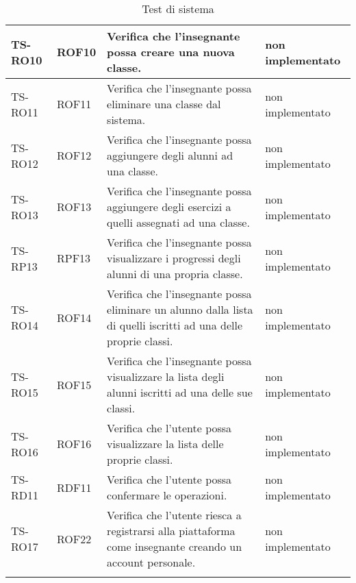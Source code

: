 \begin{longtable}{|>{\centering\arraybackslash}m{1.6cm}|>{\centering\arraybackslash}m{1.7cm}|m{6.41cm}|>{\centering\arraybackslash}m{3.1cm}|}
		\rowcolor{white}
		TS-RO10	
		& ROF10 
		& Verifica che l'insegnante possa creare una nuova classe. 
		& non implementato\\ \hline
		\rowcolor{LightGray}
		TS-RO11	
		& ROF11 
		& Verifica che l'insegnante possa eliminare una classe dal sistema. 
		& non implementato\\ \hline
		\rowcolor{white}
		TS-RO12
		& ROF12 
		& Verifica che l'insegnante possa aggiungere degli alunni ad una classe. 
		& non implementato\\ \hline
		\rowcolor{LightGray}
		TS-RO13
		& ROF13 
		& Verifica che l'insegnante possa aggiungere degli esercizi a quelli assegnati ad una classe. 
		& non implementato\\ \hline
		\rowcolor{white}
		TS-RP13
		& RPF13 
		& Verifica che l'insegnante possa visualizzare i progressi degli alunni di una propria classe.
		& non implementato\\ \hline
		\rowcolor{LightGray}
		TS-RO14
		& ROF14 
		& Verifica che l'insegnante possa eliminare un alunno dalla lista di quelli iscritti ad una delle proprie classi. 
		& non implementato\\ \hline
		\rowcolor{white}
		TS-RO15	
		& ROF15 
		& Verifica che l'insegnante possa visualizzare la lista degli alunni iscritti ad una delle sue classi. 
		& non implementato\\ \hline
		\rowcolor{LightGray}
		TS-RO16
		& ROF16 
		& Verifica che l'utente possa visualizzare la lista delle proprie classi. 
		& non implementato\\ \hline
		\rowcolor{white}
		TS-RD11	
		& RDF11 
		& Verifica che l'utente possa confermare le operazioni.
		& non implementato\\ \hline
		\rowcolor{LightGray}
		TS-RO17
		& ROF22 
		& Verifica che l'utente riesca a registrarsi alla piattaforma come insegnante creando un account personale. 
		& non implementato\\ \hline
		
		\caption{Test di sistema}
\end{longtable}

